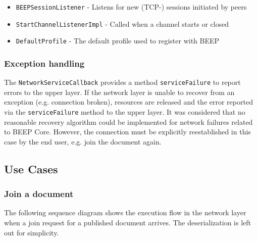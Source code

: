 \begin{itemize}
\item \texttt{BEEPSessionListener}		- 	Listens for new (TCP-) sessions initiated by peers
\item \texttt{StartChannelListenerImpl} 	-	Called when a channel starts or closed 
\item \texttt{DefaultProfile}				-	The default profile used to register with BEEP
\end{itemize}


\subsubsection{Exception handling}
\label{chapter:network.exceptionhandling}
The \texttt{NetworkServiceCallback} provides a method \texttt{serviceFailure} to report errors to the upper layer. If the network layer is unable to recover from an exception (e.g. connection broken), resources are released and the error reported via the \texttt{serviceFailure} method to the upper layer. It was considered that no reasonable recovery algorithm could be implemented for network failures related to BEEP Core. However, the connection must be explicitly reestablished in this case by the end user, e.g. join the document again.


\subsection{Use Cases}
\label{chaper:protocol.usecases}

\subsubsection{Join a document}
The following sequence diagram shows the execution flow in the network layer when a join request for a published document arrives. The deserialization is left out for simplicity.

